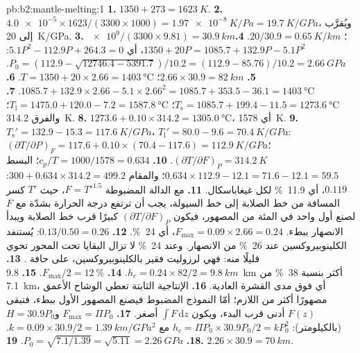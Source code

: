 \begin{solution}{pb:b2:mantle-melting:1}
\textbf{1.} $1350 + 273 = \qty{1623}{K}$.
\textbf{2.} $\num{4.0e-5}\times1623/(3300\times1000) = \qty{1.97e-8}{K/Pa} =
\qty{19.7}{K/GPa}$، ويُقرَّب إلى \qty{20}{K/GPa}.
\textbf{3.} $\num{e9}/(3300\times9.81) = \qty{30.9}{km}$؛ $20/30.9 =
\qty{0.65}{K/km}$.
\textbf{4.} $1350 + 20P = 1085.7 + 132.9P - 5.1P^2$، أي $5.1P^2 - 112.9P +
264.3 = 0$: $P_0 = (112.9 - \sqrt{12746.4 - 5391.7})/10.2 = (112.9 - 85.76)/10.2 =
\qty{2.66}{GPa}$.
\textbf{5.} $2.66\times30.9 = \qty{82}{km}$؛ $T = 1350 + 20\times2.66 =
\qty{1403}{\celsius}$.
\textbf{6.} $1085.7 + 132.9\times2.66 - 5.1\times2.66^2 = 1085.7 + 353.5 - 36.1 =
\qty{1403}{\celsius}$.
\textbf{7.} $T_{\mathrm s} = 1085.7 + 199.4 - 11.5 = \qty{1273.6}{\celsius}$؛
$T_{\mathrm l} = 1475.0 + 120.0 - 7.2 = \qty{1587.8}{\celsius}$؛ والفرق
\qty{314.2}{K}.
\textbf{8.} $1273.6 + 0.10\times314.2 = \qty{1305.0}{\celsius}$، أي \qty{1578}{K}.
\textbf{9.} $T_{\mathrm s}' = 132.9 - 15.3 = \qty{117.6}{K/GPa}$، $T_{\mathrm l}' =
80.0 - 9.6 = \qty{70.4}{K/GPa}$: $(\partial T/\partial P)_F = 117.6 +
0.10\times(70.4 - 117.6) = \qty{112.9}{K/GPa}$؛ $(\partial T/\partial F)_P =
\qty{314.2}{K}$.
\textbf{10.} $c_p/T = 1000/1578 = 0.634$؛ البسط $0.634\times112.9 - 12.1 = 71.6
- 12.1 = 59.5$؛ والمقام $300 + 0.634\times314.2 = 499.2$: $0.119$، أي
\qty{11.9}{\percent} لكل غيغاباسكال.
\textbf{11.} مع الدالة المضبوطة $F = T'^{1.5}$، حيث $T'$ كسر المسافة من خط الصلابة إلى خط السيولة، يجب أن ترتفع درجة الحرارة بشدّة مع $F$ لصنع
أول واحد في المئة من المصهور، فيكون $(\partial T/\partial F)_P$ كبيرًا قرب خط الصلابة
ويبدأ الانصهار ببطء. $F_{\max} = 0.09\times2.66 = 0.24$، أي \qty{24}{\percent}.
\textbf{12.} $0.13/0.50 = 0.26$: يُستنفد الكلينوبيروكسين عند \qty{26}{\percent} من
الانصهار. وعند \qty{24}{\percent} لا تزال البقايا تحت المحور تحوي قليلًا منه:
فهي لرزوليت فقير بالكلينوبيروكسين، على حافة .
\textbf{13.} $h_c = 0.24\times82/2 = \qty{9.8}{km}$.
\textbf{14.} $F_{\max}/2 = \qty{12}{\percent}$.
\textbf{15.} \qty{9.8}{km} أكثر بنسبة \qty{38}{\percent} من \qty{7.1}{km}، أي فوق
مدى القشرة العادية.
\textbf{16.} الإنتاجية الثابتة تعطي الوشاح الأعمق مصهورًا أكثر من اللازم؛ أمّا
النموذج المضبوط فيصنع المصهور الأول ببطء، فتبقى $F(z)$ أدنى قرب البدء،
ويكون $\int F\,\mathrm dz$ أصغر.
\textbf{17.} $F_{\max} = \Pi P_0$ و$H = 30.9P_0$ (بالكيلومتر): $h_c = \Pi P_0\times30.9P_0/2
= kP_0^2$ مع $k = 0.09\times30.9/2 = \qty{1.39}{km/GPa^2}$.
\textbf{18.} $P_0 = \sqrt{7.1/1.39} = \sqrt{5.11} = \qty{2.26}{GPa}$.
\textbf{19.} $2.26\times30.9 = \qty{70}{km}$.

\end{solution}
